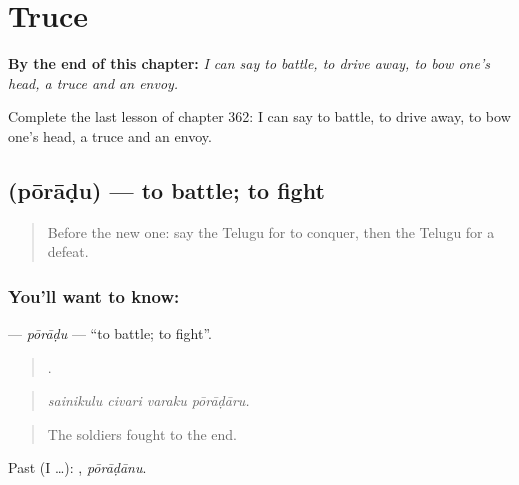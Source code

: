 
\chapter{Truce}
\label{ch:te-truce}

\begin{chapteropening}
\textbf{By the end of this chapter:} \emph{I can say to battle, to drive away, to bow one's head, a truce and an envoy.}

Complete the last lesson of chapter 362: I can say to battle, to drive away, to bow one's head, a truce and an envoy.
\end{chapteropening}

\section[\texorpdfstring{\te{పోరాడు} (pōrāḍu)}{పోరాడు (pōrāḍu)}]{ (pōrāḍu) — to battle; to fight}

\label{lesson:TE-C362-poradu}



\begin{quote}
Before the new one: say the Telugu for to conquer, then the Telugu for a defeat.
\end{quote}

\subsection*{You'll want to know: }
\textbf{} — \emph{pōrāḍu} — \textquotedblleft{}to battle; to fight\textquotedblright{}.

\begin{quote}
   .
\end{quote}

\begin{quote}
\emph{sainikulu civari varaku pōrāḍāru.}
\end{quote}

\begin{quote}
The soldiers fought to the end.
\end{quote}

Past (I …): , \emph{pōrāḍānu}.

